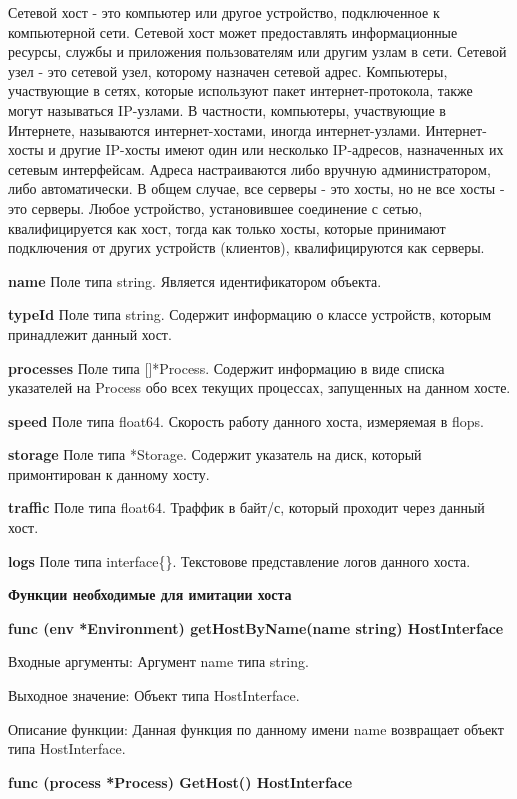 \par 
Сетевой хост - это компьютер или другое устройство, подключенное к компьютерной сети. Сетевой хост может предоставлять информационные ресурсы, службы и приложения пользователям или другим узлам в сети. Сетевой узел - это сетевой узел, которому назначен сетевой адрес.
Компьютеры, участвующие в сетях, которые используют пакет интернет-протокола, также могут называться IP-узлами. В частности, компьютеры, участвующие в Интернете, называются интернет-хостами, иногда интернет-узлами. Интернет-хосты и другие IP-хосты имеют один или несколько IP-адресов, назначенных их сетевым интерфейсам. Адреса настраиваются либо вручную администратором, либо автоматически. В общем случае, все серверы - это хосты, но не все хосты - это серверы. Любое устройство, установившее соединение с сетью, квалифицируется как хост, тогда как только хосты, которые принимают подключения от других устройств (клиентов), квалифицируются как серверы.

\textbf{name}      
Поле типа string. Является идентификатором объекта.  

\textbf{typeId} 
Поле типа string. Содержит информацию о классе устройств, которым принадлежит данный хост. 

\textbf{processes} 
Поле типа []*Process. Содержит информацию в виде списка указателей на Process обо всех текущих процессах, запущенных на данном хосте. 

\textbf{speed}     
Поле типа float64. Скорость работу данного хоста, измеряемая в flops.

\textbf{storage}   
Поле типа *Storage. Содержит указатель на диск, который примонтирован к данному хосту.

\textbf{traffic} 
Поле типа float64. Траффик в байт/с, который проходит через данный хост.

\textbf{logs} 
Поле типа interface\{\}. Текстовове представление логов данного хоста.

\textbf{Функции необходимые для имитации хоста}

\textbf{func (env *Environment) getHostByName(name string) HostInterface}

Входные аргументы: Аргумент name типа string.

Выходное значение: Объект типа HostInterface.

Описание функции: Данная функция по данному имени name возвращает объект типа HostInterface.


\textbf{func (process *Process) GetHost() HostInterface }

